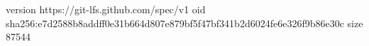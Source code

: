 version https://git-lfs.github.com/spec/v1
oid sha256:e7d2588b8addff0e31b664d807e879bf5f47bf341b2d6024fe6e326f9b86e30c
size 87544
